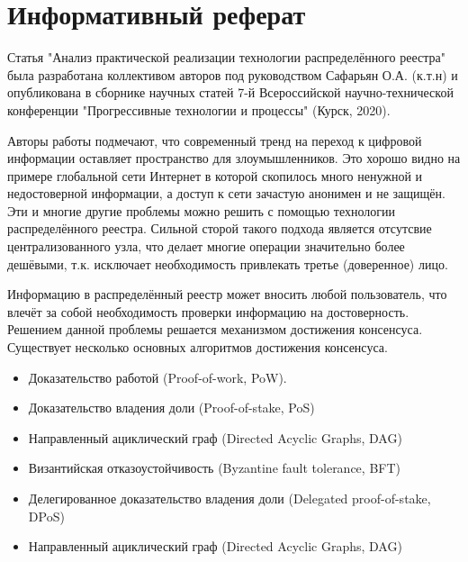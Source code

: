 \documentclass[a4paper, 12pt]{report}		%
\begin{document}
\section*{Информативный реферат}
Статья "Анализ практической реализации технологии распределённого реестра" была разработана коллективом авторов под руководством Сафарьян О.А. (к.т.н) и опубликована в сборнике научных статей 7-й Всероссийской научно-технической конференции "Прогрессивные технологии и процессы" (Курск, 2020).

Авторы работы подмечают, что современный тренд на переход к цифровой информации оставляет пространство для злоумышленников. Это хорошо видно на примере глобальной сети Интернет в которой скопилось много ненужной и недостоверной информации, а доступ к сети
зачастую анонимен и не защищён. Эти и многие другие проблемы можно решить с помощью технологии распределённого реестра. Сильной сторой такого подхода является отсутсвие централизованного узла, что делает многие операции значительно более дешёвыми, т.к. исключает необходимость привлекать третье (доверенное) лицо.

Информацию в распределённый реестр может вносить любой пользователь, что влечёт за собой необходимость проверки информацию на достоверность. Решением данной проблемы решается механизмом достижения консенсуса. Существует несколько основных алгоритмов достижения консенсуса.

\begin{itemize}
\item Доказательство работой (Proof-of-work, PoW).
\item Доказательство владения доли (Proof-of-stake, PoS)
\item Направленный ациклический граф (Directed Acyclic Graphs, DAG)
\item Византийская отказоустойчивость (Byzantine fault tolerance, BFT)
\item Делегированное доказательство владения доли (Delegated proof-of-stake, DPoS)
\item Направленный ациклический граф (Directed Acyclic Graphs, DAG)
\end{itemize}
\end{document}

